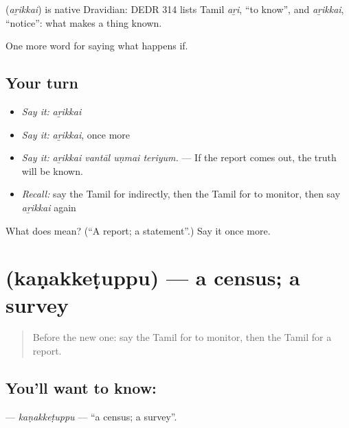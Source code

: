 \begin{cousinweb}
\textbf{} (\emph{aṟikkai}) is native Dravidian: DEDR 314 lists Tamil \emph{aṟi}, \textquotedblleft{}to know\textquotedblright{}, and \emph{aṟikkai}, \textquotedblleft{}notice\textquotedblright{}: what makes a thing known.
\end{cousinweb}

\begin{grammarlens}[title={What you've built}]
One more word for saying what happens if.
\end{grammarlens}

\subsection*{Your turn}
\begin{itemize}
\raggedright
  \item \emph{Say it:} \emph{aṟikkai}
  \item \emph{Say it:} \emph{aṟikkai}, once more
  \item \emph{Say it:} \emph{aṟikkai vantāl uṇmai teriyum.} — If the report comes out, the truth will be known.
  \item \emph{Recall:} say the Tamil for indirectly, then the Tamil for to monitor, then say \emph{aṟikkai} again
\end{itemize}

\begin{tcolorbox}[breakable,colback=teal!4,colframe=teal!35!black,title={Before you move on}]
What does  mean? (\textquotedblleft{}A report; a statement\textquotedblright{}.) Say it once more.
\end{tcolorbox}
\section[\texorpdfstring{\ta{கணக்கெடுப்பு} (kaṇakkeṭuppu)}{கணக்கெடுப்பு (kaṇakkeṭuppu)}]{ (kaṇakkeṭuppu) — a census; a survey}

\label{lesson:TA-C393-kanakketuppu}



\begin{quote}
Before the new one: say the Tamil for to monitor, then the Tamil for a report.
\end{quote}

\subsection*{You'll want to know: }
\textbf{} — \emph{kaṇakkeṭuppu} — \textquotedblleft{}a census; a survey\textquotedblright{}.

